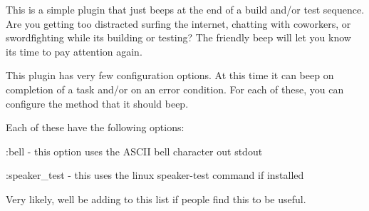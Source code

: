 This is a simple plugin that just beeps at the end of a build and/or test sequence. Are you getting too distracted surfing the internet, chatting with coworkers, or swordfighting while it\textquotesingle{}s building or testing? The friendly beep will let you know it\textquotesingle{}s time to pay attention again.

This plugin has very few configuration options. At this time it can beep on completion of a task and/or on an error condition. For each of these, you can configure the method that it should beep.


\begin{DoxyCode}{0}

\end{DoxyCode}


Each of these have the following options\+:


\begin{DoxyItemize}
\item \+:bell -\/ this option uses the ASCII bell character out stdout
\item \+:speaker\+\_\+test -\/ this uses the linux speaker-\/test command if installed
\end{DoxyItemize}

Very likely, we\textquotesingle{}ll be adding to this list if people find this to be useful. 